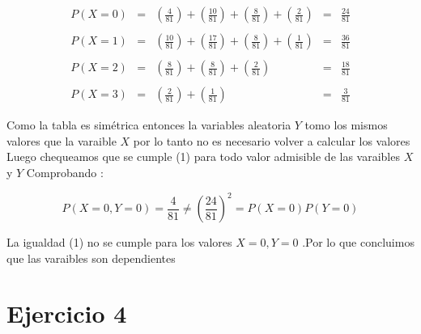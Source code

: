 \documentclass[12pt]{article}
\begin{document}
\begin{equation*}
    \begin{array}{rclcl}
        \displaystyle P\left(X = 0\right)   & = & \displaystyle \left( \frac{4}{81}\right) + \left(\frac{10}{81}\right) + \left(\frac{8}{81}\right) +\left( \frac{2}{81}\right)     & = &  \displaystyle \frac{24}{81}
        \\
        \\
        \displaystyle  P\left(X = 1\right)   & = & \displaystyle \left(\frac{10}{81}\right) + \left(\frac{17}{81}\right) + \left(\frac{8}{81}\right)  + \left(\frac{1}{81}\right)   & = & \displaystyle \frac{36}{81}
        \\
        \\
        \displaystyle P\left(X = 2\right)   & = & \displaystyle \left(\frac{8}{81}\right) + \left(\frac{8}{81}\right) + \left(\frac{2}{81}\right)                                           & = & \displaystyle \frac{18}{81}
        \\
        \\
        \displaystyle P\left(X = 3\right)   & = & \displaystyle  \left(\frac{2}{81}\right) + \left(\frac{1}{81}\right)                                                                 & = & \displaystyle \frac{3}{81}
    \end{array}
\end{equation*}

\begin{flushleft}

Como la tabla es sim\'etrica entonces la variables aleatoria $Y$ tomo los mismos valores que la varaible $X$
por lo tanto no es necesario volver a  calcular los valores 
Luego chequeamos que se cumple (1) para todo valor admisible de las varaibles $X$ y $Y$ Comprobando :  
\end{flushleft}


\begin{equation*}
    P\left(X = 0,Y = 0\right) =   \displaystyle \frac{4}{81}  \neq \displaystyle \left(\frac{24}{81}\right)^2 = P\left(X = 0\right) P\left(Y = 0\right)
\end{equation*}

\begin{flushleft}
    La igualdad (1) no se cumple para los valores  $X = 0,Y = 0$ .Por lo que concluimos que 
    las varaibles son dependientes 
\end{flushleft}


\section*{Ejercicio 4 }
\end{document}
